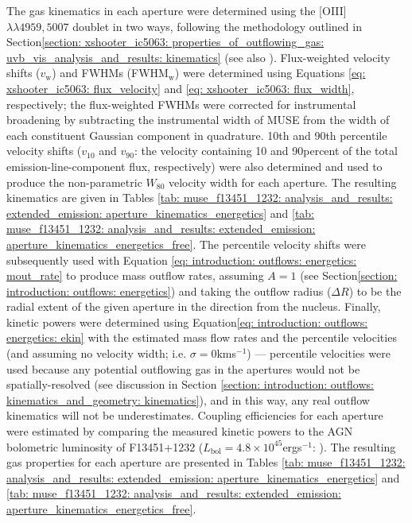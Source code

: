The gas kinematics in each aperture were determined using the [OIII]$\lambda\lambda4959,5007$ doublet in two ways, following the methodology outlined in Section\;\ref{section: xshooter_ic5063: properties_of_outflowing_gas: uvb_vis_analysis_and_results: kinematics} (see also \citealt{Rose2018}). Flux-weighted velocity shifts ($v_\mathrm{w}$) and FWHMs (FWHM$_\mathrm{w}$) were determined using Equations \ref{eq: xshooter_ic5063: flux_velocity} and \ref{eq: xshooter_ic5063: flux_width}, respectively; the flux-weighted FWHMs were corrected for instrumental broadening by subtracting the instrumental width of MUSE from the width of each constituent Gaussian component in quadrature. 10th and 90th percentile velocity shifts ($v_\mathrm{10}$ and $v_\mathrm{90}$: the velocity containing 10 and 90\;per\;cent of the total emission-line-component flux, respectively) were also determined and used to produce the non-parametric $W_\mathrm{80}$ velocity width for each aperture. The resulting kinematics are given in Tables \ref{tab: muse_f13451_1232: analysis_and_results: extended_emission: aperture_kinematics_energetics} and \ref{tab: muse_f13451_1232: analysis_and_results: extended_emission: aperture_kinematics_energetics_free}. The percentile velocity shifts were subsequently used with Equation \ref{eq: introduction: outflows: energetics: mout_rate} to produce mass outflow rates, assuming $A=1$ (see Section\;\ref{section: introduction: outflows: energetics}) and taking the outflow radius (${\Delta}R$) to be the radial extent of the given aperture in the direction from the nucleus. Finally, kinetic powers were determined using Equation\;\ref{eq: introduction: outflows: energetics: ekin} with the estimated mass flow rates and the percentile velocities (and assuming no velocity width; i.e. $\sigma=0$\;km\;s$^{-1}$) --- percentile velocities were used because any potential outflowing gas in the apertures would not be spatially-resolved (see discussion in Section \ref{section: introduction: outflows: kinematics_and_geometry: kinematics}), and in this way, any real outflow kinematics will not be underestimates. Coupling efficiencies for each aperture were estimated by comparing the measured kinetic powers to the AGN bolometric luminosity of F13451+1232 ($L_\mathrm{bol}=4.8\times10^{45}$\;erg\;s$^{-1}$: \citealt{Rose2018}). The resulting gas properties for each aperture are presented in Tables \ref{tab: muse_f13451_1232: analysis_and_results: extended_emission: aperture_kinematics_energetics} and \ref{tab: muse_f13451_1232: analysis_and_results: extended_emission: aperture_kinematics_energetics_free}.

